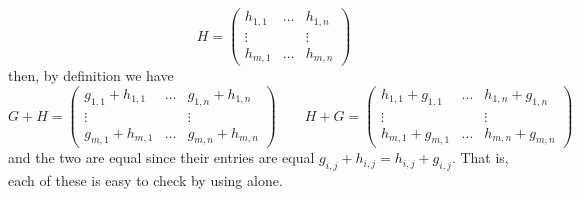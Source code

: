 \begin{exercises}
\begin{answer}
\begin{equation*}
        \qquad
        H=
        \begin{pmatrix}
          h_{1,1}  &\ldots  &h_{1,n}  \\
          \vdots   &        &\vdots   \\
          h_{m,1}  &\ldots  &h_{m,n}       
        \end{pmatrix}
      \end{equation*}
      then, by definition we have
      \begin{equation*}
        G+H=
        \begin{pmatrix}
          g_{1,1}+h_{1,1}  &\ldots  &g_{1,n}+h_{1,n}  \\
          \vdots           &        &\vdots           \\
          g_{m,1}+h_{m,1}  &\ldots  &g_{m,n}+h_{m,n}       
        \end{pmatrix}
        \qquad
        H+G=
        \begin{pmatrix}
          h_{1,1}+g_{1,1}  &\ldots  &h_{1,n}+g_{1,n}  \\
          \vdots           &        &\vdots           \\
          h_{m,1}+g_{m,1}  &\ldots  &h_{m,n}+g_{m,n}       
        \end{pmatrix}
      \end{equation*}
      and the two are equal since their entries are equal 
      $g_{i,j}+h_{i,j}=h_{i,j}+g_{i,j}$.
      That is, each of these is easy to check by using 
       alone.


\end{answer}
\end{exercises}
